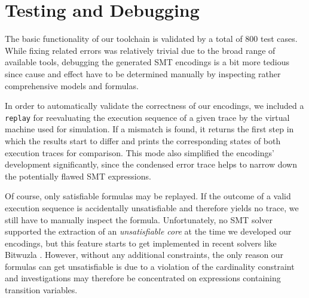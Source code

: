 \section{Testing and Debugging}

The basic functionality of our toolchain is validated by a total of 800 test cases.
While fixing {\CPP} related errors was relatively trivial due to the broad range of available tools,
debugging the generated SMT encodings
is a bit more tedious
since cause and effect have to be determined manually by inspecting rather comprehensive models and formulas.

In order to automatically validate the correctness of our encodings, we included a \texttt{replay}  for reevaluating the execution sequence of a given trace by the virtual machine used for simulation.
If a mismatch is found, it returns the first step in which the results start to differ and prints the corresponding states of both execution traces for comparison.
This mode also simplified the encodings' development significantly,
since the condensed error trace helps to narrow down the potentially flawed SMT expressions.

Of course, only satisfiable formulas may be replayed.
If the outcome of a valid execution sequence is accidentally unsatisfiable and therefore yields no trace, we still have to manually inspect the formula.
Unfortunately, no SMT solver supported the extraction of an \emph{unsatisfiable core} at the time we developed our encodings, but this feature starts to get implemented in recent solvers like Bitwuzla \cite{ref:Bitwuzla}.
However, without any additional constraints, the only reason our formulas can get unsatisfiable is due to a violation of the cardinality constraint and investigations may therefore be concentrated on expressions containing transition variables.

